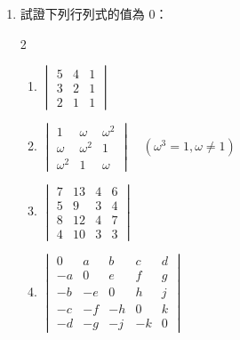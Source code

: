 \begin{enumerate}[label=\arabic*., leftmargin=2em]
  \item 試證下列行列式的值為 0：
  \begin{multicols}{2}
  \begin{enumerate}[label=(\roman*)]
    \item $\begin{vmatrix} 5 & 4 & 1 \\ 3 & 2 & 1 \\ 2 & 1 & 1 \end{vmatrix}$
    \item $\begin{vmatrix} 1 & \omega & \omega^2 \\ \omega & \omega^2 & 1 \\ \omega^2 & 1 & \omega \end{vmatrix} \quad (\omega^3=1, \omega\ne 1)$
    \item $\begin{vmatrix} 7 & 13 & 4 & 6 \\ 5 & 9 & 3 & 4 \\ 8 & 12 & 4 & 7 \\ 4 & 10 & 3 & 3 \end{vmatrix}$
    \item $\begin{vmatrix}
    0 & a & b & c & d \\
    -a & 0 & e & f & g \\
    -b & -e & 0 & h & j \\
    -c & -f & -h & 0 & k \\
    -d & -g & -j & -k & 0
    \end{vmatrix}$
  \end{enumerate}
  \end{multicols}


\end{enumerate}
